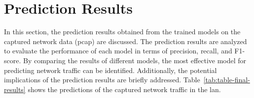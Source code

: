 \section{Prediction Results}\label{sec:prediction-results}

In this section, the prediction results obtained from the trained models on the captured network data (\gls{pcap}) are discussed.
The prediction results are analyzed to evaluate the performance of each model in terms of precision, recall, and F1-score.
By comparing the results of different models, the most effective model for predicting network traffic can be identified.
Additionally, the potential implications of the prediction results are briefly addressed.
Table~\ref{tab:table-final-results} shows the predictions of the captured network traffic in the \gls{lan}.


